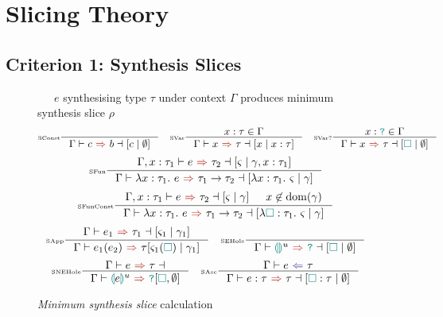 \chapter{Slicing Theory}
\section{Criterion 1: Synthesis Slices}
\begin{figure}[H]
\small
{}\ \ \ $e$ synthesising type $\tau$ under context $\Gamma$ produces minimum synthesis slice $\rho$
\tiny
\[\inference[\tiny SConst]{}{\synthesisslice{c}{b}{[c\mid \emptyset]}} \quad
\inference[\tiny SVar]{x : \tau \in \Gamma}{\synthesisslice{x}{\tau}{[x\mid x:\tau]}} \quad
\inference[\tiny SVar?]{x : \dyn \in \Gamma}{\synthesisslice{x}{\tau}{[\gap\mid \emptyset]}}\]
\[\inference[\tiny SFun]{\synthesisslice[\Gamma,x:\tau_1]{e}{\tau_2}{[\varsigma \mid \gamma, x : \tau_1]} }{\synthesisslice{\lambda x:\tau_1.\ e}{\tau_1 \to \tau_2}{[\lambda x : \tau_1.\ \varsigma \mid \gamma]}}\]
\[\inference[\tiny SFunConst]{\synthesisslice[\Gamma,x:\tau_1]{e}{\tau_2}{[\varsigma \mid \gamma]} & x \not \in \mathrm{dom}(\gamma)}{\synthesisslice{\lambda x:\tau_1.\ e}{\tau_1 \to \tau_2}{[\lambda \gap : \tau_1.\ \varsigma \mid \gamma]}}\]
\[\inference[\tiny SApp]{\synthesisslice{e_1}{\tau_1}{[\varsigma_1 \mid \gamma_1]}}{\synthesis{e_1(e_2)}{\tau}{[\varsigma_1(\gap) \mid \gamma_1]}} \quad 
\inference[\tiny SEHole]{}{\synthesisslice{\hole^u}{\dyn}{[\gap \mid \emptyset]}}\]
\[\inference[\tiny SNEHole]{\synthesisslice{e}{\tau}}{\synthesis{\hole[e]^u}{\dyn}{[\gap, \emptyset]}}\quad 
\inference[\tiny SAsc]{\analysis{e}{\tau}}{\synthesisslice{e : \tau}{\tau}{[\gap : \tau \mid \emptyset]}}\]

\caption{\textit{Minimum synthesis slice} calculation}
\label{fig:SynthesisSlices}
\end{figure} 

